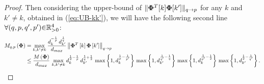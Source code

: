 \begin{proof}
{Then considering the upper-bound of $\Vert \boldsymbol{\Phi}^T [k] \boldsymbol{\Phi} [k'] \Vert_{q {\to} p}$ for any $k$ and $k' {\neq} k$, obtained in ({\ref{eq:UB-kk'}}), 
we will have the following second line $\forall (q , p , q' , p') {\in} \mathbb{R}^4_{{>} 0}$:}
\begin{gather*}
\label{eq:prp-BMIC-MIC}
\begin{aligned}
M_{q,p}\left( \boldsymbol{\Phi} \right) &= \max_{k,k' \neq k} \frac{d_{k}^{-\frac1p} \, d_{k'}^{\frac1q}}{d_{max}} \left\lVert\boldsymbol{\Phi}^T \left[ k \right] \boldsymbol{\Phi} \left[ k' \right]\right\rVert_{q \to p} \\
&\leq \frac{M\left( \boldsymbol{\Phi} \right)}{d_{max}} \, \max_{k,k' \neq k} d_{k}^{\frac12 - \frac1p} \, d_{k'}^{\frac1q + \frac12} \, \max \left\lbrace 1 , d_k^{\frac1p - \frac{1}{p'}} \right\rbrace \, \max \left\lbrace 1 , d_{k'}^{\frac{1}{q'} - \frac1q} \right\rbrace \, \max \left\lbrace 1 , d_k^{\frac{1}{p'} -\frac12} \right\rbrace \, \max \left\lbrace 1 , d_{k'}^{\frac{1}{2} - \frac{1}{q'}} \right\rbrace.  \\
\end{aligned}
\end{gather*}
\end{proof}